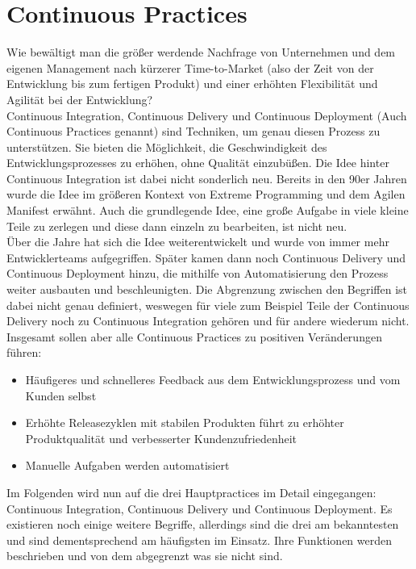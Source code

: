 \section{Continuous Practices}\label{CP}
Wie bewältigt man die größer werdende Nachfrage von Unternehmen und dem eigenen Management nach kürzerer Time-to-Market (also der Zeit von der Entwicklung bis zum fertigen Produkt) und einer erhöhten Flexibilität und Agilität bei der Entwicklung?\autocite{Capgemini.2017}\\ Continuous Integration, Continuous Delivery und Continuous Deployment (Auch Continuous Practices genannt) sind Techniken, um genau diesen Prozess zu unterstützen.  Sie bieten die Möglichkeit, die Geschwindigkeit des Entwicklungsprozesses zu erhöhen, ohne Qualität einzubüßen.\autocite[Vgl.][S.2]{Shahin.2017}
Die Idee hinter Continuous Integration ist dabei nicht sonderlich neu. Bereits in den 90er Jahren wurde die Idee im größeren Kontext von Extreme Programming und dem Agilen Manifest erwähnt.\autocite[Vgl.][S.2]{Stahl.2018} Auch die grundlegende Idee, eine große Aufgabe in viele kleine Teile zu zerlegen und diese dann einzeln zu bearbeiten, ist nicht neu.\\ Über die Jahre hat sich die Idee weiterentwickelt und wurde von immer mehr Entwicklerteams aufgegriffen. Später kamen dann noch Continuous Delivery und Continuous Deployment hinzu, die mithilfe von Automatisierung den Prozess weiter ausbauten und beschleunigten. Die Abgrenzung zwischen den Begriffen ist dabei nicht genau definiert, weswegen für viele zum Beispiel Teile der Continuous Delivery noch zu Continuous Integration gehören und für andere wiederum nicht. Insgesamt sollen aber alle Continuous Practices zu positiven Veränderungen führen:\autocite[Vgl.][S.2]{Shahin.2017}
\begin{itemize}
	\item Häufigeres und schnelleres Feedback aus dem Entwicklungsprozess und vom Kunden selbst 
	\item Erhöhte Releasezyklen mit stabilen Produkten führt zu erhöhter Produktqualität und verbesserter Kundenzufriedenheit
	\item Manuelle Aufgaben werden automatisiert
\end{itemize}
Im Folgenden wird nun auf die drei Hauptpractices im Detail eingegangen: Continuous Integration, Continuous Delivery und Continuous Deployment. Es existieren noch einige weitere Begriffe, allerdings sind die drei am bekanntesten und sind dementsprechend am häufigsten im Einsatz. Ihre Funktionen werden beschrieben und von dem abgegrenzt was sie nicht sind. 
